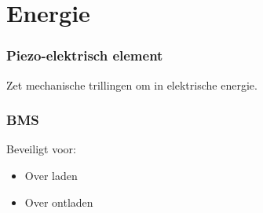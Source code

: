 \section{Energie}
    \begin{frame}
        \frametitle{Piezo-elektrisch element}
    
        Zet mechanische trillingen om in elektrische energie.
    
    \end{frame}
    \begin{frame}
        \frametitle{BMS}
    
        Beveiligt voor:
        \begin{itemize}
            \item Over laden
            \item Over ontladen
        \end{itemize}
    
    \end{frame}
    
        
    
